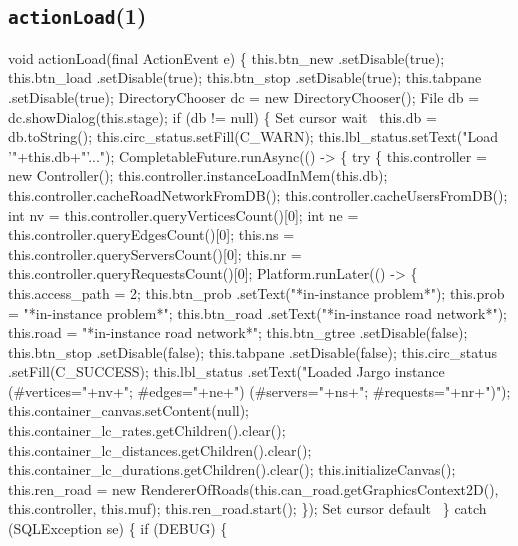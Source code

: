 \subsection{\texttt{actionLoad}(1)}
\nwenddocs{}\endmoddef{}
void actionLoad(final ActionEvent e) \{
  this.btn_new      .setDisable(true);
  this.btn_load     .setDisable(true);
  this.btn_stop     .setDisable(true);
  this.tabpane      .setDisable(true);
  DirectoryChooser dc = new DirectoryChooser();
  File db = dc.showDialog(this.stage);
  if (db != null) \{
    \LA{}Set cursor wait~{\nwtagstyle{}}\RA{}
    this.db = db.toString();
    this.circ_status.setFill(C_WARN);
    this.lbl_status.setText("Load '"+this.db+"'...");
    CompletableFuture.runAsync(() -> \{
      try \{
        this.controller = new Controller();
        this.controller.instanceLoadInMem(this.db);
        this.controller.cacheRoadNetworkFromDB();
        this.controller.cacheUsersFromDB();
        int nv = this.controller.queryVerticesCount()[0];
        int ne = this.controller.queryEdgesCount()[0];
        this.ns = this.controller.queryServersCount()[0];
        this.nr = this.controller.queryRequestsCount()[0];
        Platform.runLater(() -> \{
          this.access_path = 2;
          this.btn_prob     .setText("*in-instance problem*");
          this.prob = "*in-instance problem*";
          this.btn_road     .setText("*in-instance road network*");
          this.road = "*in-instance road network*";
          this.btn_gtree    .setDisable(false);
          this.btn_stop     .setDisable(false);
          this.tabpane      .setDisable(false);
          this.circ_status  .setFill(C_SUCCESS);
          this.lbl_status   .setText("Loaded Jargo instance (#vertices="+nv+"; #edges="+ne+") (#servers="+ns+"; #requests="+nr+")");
          this.container_canvas.setContent(null);
          this.container_lc_rates.getChildren().clear();
          this.container_lc_distances.getChildren().clear();
          this.container_lc_durations.getChildren().clear();
          this.initializeCanvas();
          this.ren_road = new RendererOfRoads(this.can_road.getGraphicsContext2D(), this.controller, this.muf);
          this.ren_road.start();
        \});
        \LA{}Set cursor default~{\nwtagstyle{}}\RA{}
      \} catch (SQLException se) \{
        if (DEBUG) \{
